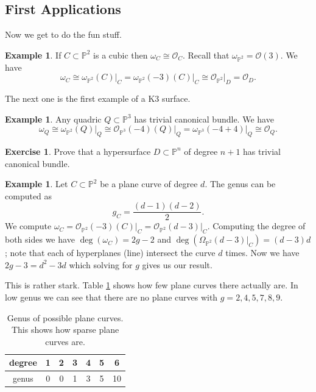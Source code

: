 \documentclass[12pt]{article}
\numberwithin{equation}{section}
\theoremstyle{definition}
\newtheorem{example}[theorem]{Example}
\newtheorem{exercise}[theorem]{Exercise}
\theoremstyle{remark}
\newcommand{\Ocal}{\mathcal{O}}
\newcommand{\PP}{\mathbb{P}}
\begin{document}
\subsection{First Applications}

Now we get to do the fun stuff.
\begin{example}
	If $C\subset \PP^2$ is a cubic then $\omega_C \cong \Ocal_C$.
		Recall that $\omega_{\PP^2}= \Ocal(3)$. 
	We have 
	$$\omega_C \cong \omega_{\PP^2}(C)\vert_C = \omega_{\PP^2}(-3)(C)\vert_C \cong \Ocal_{\PP^2}\vert_D = \Ocal_D.$$
\end{example}

The next one is the first example of a K3 surface.
\begin{example}
	Any quadric $Q\subset \PP^3$ has trivial canonical bundle. 
	We have 
	$$\omega_Q \cong \omega_{\PP^2}(Q)\vert_Q \cong \Ocal_{\PP^3}(-4)(Q)\vert_Q = \omega_{\PP^3}(-4+4)\vert_Q \cong \Ocal_Q.$$
\end{example}

\begin{exercise}
	Prove that a hypersurface $D \subset \PP^n$ of degree $n+1$ has trivial canonical bundle.
\end{exercise}

\begin{example}
	Let $C \subset \PP^2$ be a plane curve of degree $d$. 
	The genus can be computed as 
	 $$ g_C = \frac{(d-1)(d-2)}{2}. $$
	We compute $\omega_C = \Ocal_{\PP^2}(-3)(C)\vert_C = \Ocal_{\PP^2}(d-3)\vert_C$. 
	Computing the degree of both sides we have $\deg(\omega_C) = 2g-2$ and $\deg(\Omega_{\PP^2}(d-3)\vert_C) = (d-3)d$; note that each of hyperplanes (line) intersect the curve $d$ times. 
	Now we have $2g-3 = d^2-3d$ which solving for $g$ gives us our result. 
\end{example}

This is rather stark. 
Table \ref{tab:plane-curves} shows how few plane curves there actually are. 
In low genus we can see that there are no plane curves with $g=2,4,5,7,8,9$.

\begin{table}\label{tab:plane-curves}
	\begin{center}
\begin{tabular}{|c||c|c|c|c|c|c|}
\hline  degree & 1 & 2 & 3 & 4 & 5 & 6 \\ \hline
	genus  & 0 & 0 & 1 & 3 & 5 & 10 \\ \hline
\end{tabular}
\end{center}
\caption{Genus of possible plane curves. 
This shows how sparse plane curves are.}
\end{table}
\end{document}

